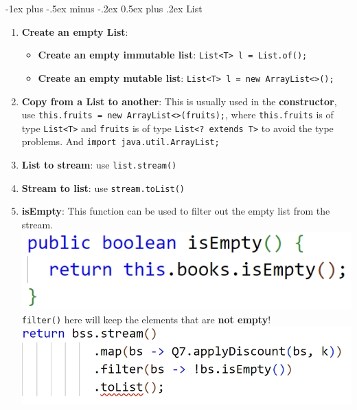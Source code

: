 \documentclass[10pt, landscape]{article}
\makeatletter
\renewcommand{\section}{\@startsection{section}{1}{0mm}%
                                {-1ex plus -.5ex minus -.2ex}%
                                {0.5ex plus .2ex}%
                                {\normalfont\large\bfseries}}
\makeatother
\begin{document}
\begin{multicols}{4}
\section{List}
\begin{enumerate}
    \item \textbf{Create an empty List}: 
    \begin{itemize}
        \item \textbf{Create an empty immutable list}: \texttt{List<T> l = List.of();}
        \item \textbf{Create an empty mutable list}: \texttt{List<T> l = new ArrayList<>();}
    \end{itemize}
    \item \textbf{Copy from a List to another}: This is usually used in the \textbf{constructor}, use \texttt{this.fruits = new ArrayList<>(fruits);}, where \texttt{this.fruits} is of type \texttt{List<T>} and \texttt{fruits} is of type \texttt{List<? extends T>} to avoid the type problems. And \texttt{import java.util.ArrayList;}
    \item \textbf{List to stream}: use \texttt{list.stream()}
    \item \textbf{Stream to list}: use \texttt{stream.toList()}
    \item \textbf{isEmpty}: This function can be used to filter out the empty list from the stream. \\
    \includegraphics[width=0.8\linewidth]{PE/PE2/images/8.png} \\
    \texttt{filter()} here will keep the elements that are \textbf{not empty}!
    \includegraphics[width=1\linewidth]{PE/PE2/images/9.png}
\end{enumerate}


\end{multicols}
\end{document}
